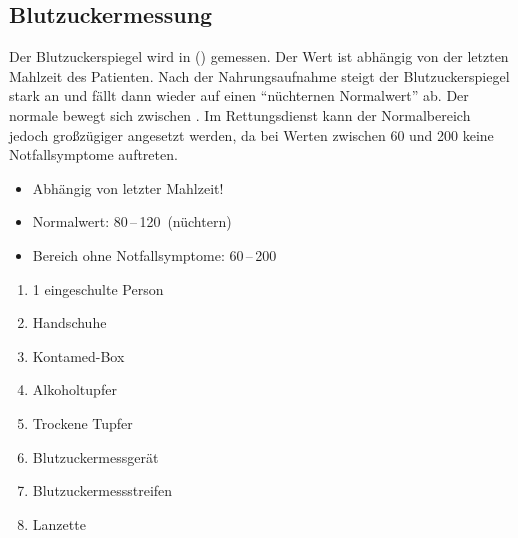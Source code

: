 \subsection{Blutzuckermessung}
\label{topic:blutzucker-messung}

{
Der Blutzuckerspiegel wird in 
() gemessen. Der
Wert ist abhängig von der letzten Mahlzeit des Patienten.
Nach der Nahrungsaufnahme steigt der Blutzuckerspiegel
stark an und fällt dann wieder auf einen "`nüchternen
Normalwert"' ab. Der normale
 bewegt sich zwischen
. Im Rettungsdienst
kann der Normalbereich jedoch großzügiger angesetzt werden,
da bei Werten zwischen 60 und 200  keine
Notfallsymptome auftreten.

}{
\begin{itemize}
    \item Abhängig von letzter Mahlzeit!
    \item Normalwert: 80\,--\,120\,
    (nüchtern)
    \item Bereich ohne Notfallsymptome:
    60\,--\,200\,
\end{itemize}
}{}{}{}

{
\begin{enumerate}
  \item 1 eingeschulte Person
  \item Handschuhe
  \item Kontamed-Box
  \item Alkoholtupfer
  \item Trockene Tupfer
  \item Blutzuckermessgerät
  \item Blutzuckermessstreifen
  \item Lanzette
\end{enumerate}
}
{}


